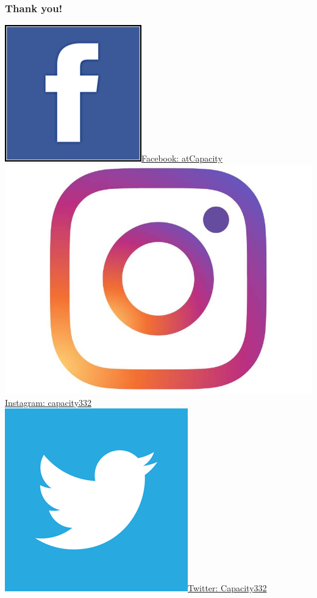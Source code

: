 \documentclass{beamer}
\begin{document}
\begin{frame}
\frametitle{Thank you!}

\begin{center}

\vspace*{7px}
\includegraphics[width=.2\linewidth]{facebook.png}\quad \href{https://www.facebook.com/AtCapacity-339587599924715/}{Facebook: atCapacity}
\\[\baselineskip]%
\includegraphics[width=.2\linewidth]{insta.jpg}\quad \href{ https://www.instagram.com/capacity332/}{Instagram: capacity332}
\\[\baselineskip]
\includegraphics[width=.2\linewidth]{twitter.png}\quad \href{https://twitter.com/Capacity_332}{Twitter: Capacity\underline{\hspace{5px}}332}
\end{center}
\end{frame}
\end{document}
